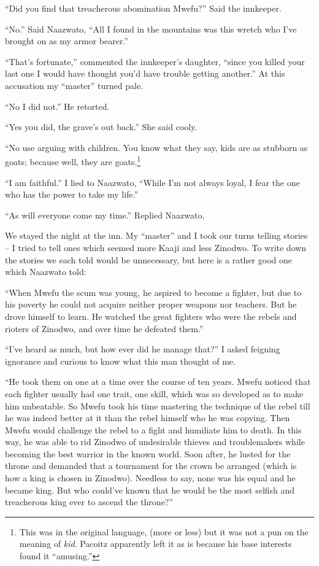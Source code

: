 ``Did you find that treacherous abomination Mwefu?'' Said the innkeeper.

``No.'' Said Naazwato, ``All I found in the mountains was this wretch who I've brought on as my armor bearer.''

``That's fortunate,'' commented the innkeeper's daughter, ``since you killed your last one I would have thought you'd have trouble getting another.'' At this accusation my ``master'' turned pale.

``No I did not.'' He retorted.

``Yes you did, the grave's out back.'' She said cooly.

``No use arguing with children. You know what they say, kids are as stubborn as goats; because well, they are goats.\footnote{This was in the original language, (more or less) but it was not a pun on the meaning of \emph{kid}. Pacoitz apparently left it as is because his base interests found it ``amusing.''}

``I am faithful.'' I lied to Naazwato, ``While I'm not always loyal, I fear the one who has the power to take my life.''

``As will everyone come my time.'' Replied Naazwato.

We stayed the night at the inn. My ``master'' and I took our turns telling stories -- I tried to tell ones which seemed more Kaaji and less Zinodwo. To write down the stories we each told would be unnecessary, but here is a rather good one which Naazwato told:

``When Mwefu the scum was young, he aspired to become a fighter, but due to his poverty he could not acquire neither proper weapons nor teachers. But he drove himself to learn. He watched the great fighters who were the rebels and rioters of Zinodwo, and over time he defeated them.''

``I've heard as much, but how ever did he manage that?'' I asked feigning ignorance and curious to know what this man thought of me.

``He took them on one at a time over the course of ten years. Mwefu noticed that each fighter usually had one trait, one skill, which was so developed as to make him unbeatable. So Mwefu took his time mastering the technique of the rebel till he was indeed better at it than the rebel himself who he was copying.
Then Mwefu would challenge the rebel to a fight and humiliate him to death. In this way, he was able to rid Zinodwo of undesirable thieves and troublemakers while becoming the best warrior in the known world. Soon after, he lusted for the throne and demanded that a tournament for the crown be arranged (which is how a king is chosen in Zinodwo). Needless to say, none was his equal and he became king. But who could've known that he would be the most selfish and treacherous king ever to ascend the throne?''

